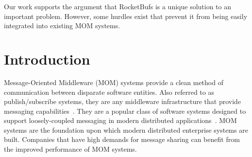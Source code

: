 \documentclass[letterpaper,twocolumn,10pt]{article}
\begin{document}
Our work supports the argument that RocketBufs is a unique solution to an important problem. However, some hurdles exist that prevent it from being easily integrated into existing MOM systems.


\section{Introduction}

Message-Oriented Middleware (MOM) systems provide a clean method of communication between disparate software entities.
Also referred to as publish/subscribe systems, they are any middleware infrastructure that provide messaging capabilities~\cite{curry2004message11}.
They are a popular class of software systems designed to support loosely-coupled
messaging in modern distributed applications~\cite{Rocketbufs}.
MOM systems are the foundation upon which modern distributed enterprise systems are built.
Companies that have high demands for message sharing can benefit from the improved performance of MOM systems.
\end{document}
